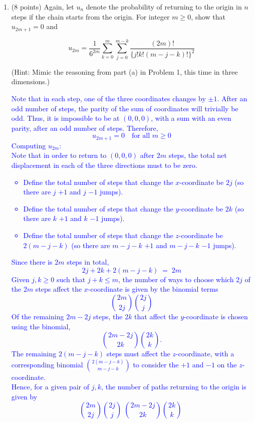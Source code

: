 \documentclass{article}
\begin{document}
\begin{enumerate}[label=(\alph*)]
    \item (8 points) Again, let $u_n$ denote the probability of returning to the origin in $n$ steps if the chain starts from the origin. For integer $m \geq 0$, show that $u_{2m+1} = 0$ and

\[
u_{2m} = \frac{1}{6^{2m}} \sum_{k=0}^{m} \sum_{j=0}^{m-k} \frac{(2m)!}{\{j! k! (m-j-k)!\}^2}
\]

(Hint: Mimic the reasoning from part (a) in Problem 1, this time in three dimensions.)

\textcolor{blue}{Note that in each step, one of the three coordinates changes by $\pm 1$. After an odd number of steps, the parity of the sum of coordinates will trivially be odd. Thus, it is impossible to be at $(0,0,0)$, with a sum with an even parity, after an odd number of steps. Therefore,
\[
u_{2m+1} = 0
\quad \text{for all } m \ge 0
\]
Computing $u_{2m}$: \\
Note that in order to return to $(0,0,0)$ after $2m$ steps, the total net displacement in each of the three directions must to be zero.  \\
\begin{itemize}
    \item Define the total number of steps that change the $x$-coordinate be $2j$ (so there are $j$ $+1$ and $j$ $-1$ jumps). 
    \item Define the total number of steps that change the $y$-coordinate be $2k$ (so there are $k$ $+1$ and $k$ $-1$ jumps). 
    \item Define the total number of steps that change the $z$-coordinate be $2(m-j-k)$ (so there are $m-j-k$ $+1$ and $m-j-k$ $-1$ jumps).
\end{itemize}
Since there is $2m$ steps in total,
\[
2j + 2k + 2(m-j-k) \;=\; 2m
\]
Given $j,k \geq 0$ such that $j + k \leq m$, the number of ways to choose which $2j$ of the $2m$ steps affect the $x$-coordinate is given by the binomial terms
\[
\binom{2m}{2j} \binom{2j}{j}
\]
Of the remaining $2m - 2j$ steps, the $2k$ that affect the $y$-coordinate is chosen using the binomial,
\[
\binom{2m - 2j}{2k} \binom{2k}{k}.
\]
The remaining $2(m-j-k)$ steps must affect the $z$-coordinate, with a corresponding binomial $\binom{2(m-j-k)}{m-j-k}$ to consider the $+1$ and $-1$ on the $z$-coordinate.  \\
Hence, for a given pair of $j,k$, the number of paths returning to the origin is given by 
\[
\binom{2m}{2j} \binom{2j}{j}\;
\binom{2m-2j}{2k} \binom{2k}{k}\;
\]}
\end{enumerate}
\end{document}
